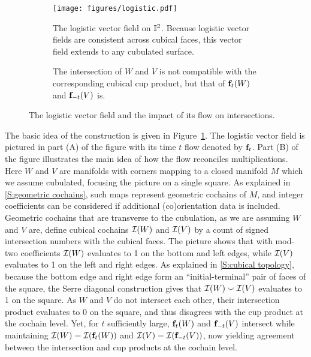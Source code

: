 \begin{figure}[h]
	\centering
	\hfill
	\begin{subfigure}[b]{0.45\textwidth}
		\hspace*{-9pt}
		\texttt{[image: figures/logistic.pdf]}
		\caption{The logistic vector field on $\mathbb{I}^2$.
		Because logistic vector fields are consistent across cubical faces, this vector field extends to any cubulated surface.}
	\end{subfigure}
	\hspace{0.2 in}
	\begin{subfigure}[b]{0.45\textwidth}
		\raisebox{9.5pt}{}
		\caption{The intersection of $W$ and $V$ is not compatible with the corresponding cubical cup product, but that of $\mathbf{f}_t(W)$ and $\mathbf{f}_{-t}(V)$ is.}
	\end{subfigure}
	\caption{The logistic vector field and the impact of its flow on intersections.}
	\label{F: logistic}
\end{figure}

The basic idea of the construction is given in Figure~\ref{F: logistic}. The logistic vector field is pictured in part (A) of the figure with its time $t$ flow denoted by
$\mathbf{f}_t$.
Part (B) of the figure illustrates the main idea of how the flow reconciles multiplications.
Here $W$ and $V$ are manifolds with corners mapping to a closed manifold $M$ which we assume cubulated, focusing the picture on a single square.
As explained in \cref{S:geometric cochains}, such maps represent geometric cochains of $M$, and integer coefficients can be considered if additional (co)orientation data is included.
Geometric cochains that are transverse to the cubulation, as we are assuming $W$ and $V$ are, define cubical cochains $\mathcal{I}(W)$ and $\mathcal{I}(V)$ by a count of signed intersection numbers with the cubical faces.
The picture shows that with mod-two coefficients $\mathcal{I}(W)$ evaluates to 1 on the bottom and left edges, while $\mathcal{I}(V)$ evaluates to 1 on the left and right edges.
As explained in \cref{S:cubical topology}, because the bottom edge and right edge form an ``initial-terminal'' pair of faces of the square, the Serre diagonal construction gives that $\mathcal{I}(W) \smallsmile \mathcal{I}(V)$ evaluates to 1 on the square.
As $W$ and $V$ do not intersect each other, their intersection product evaluates to 0 on the square, and thus disagrees with the cup product at the cochain level.
Yet, for $t$ sufficiently large, $\mathbf{f}_t(W)$ and $\mathbf{f}_{-t}(V)$ intersect while maintaining $\mathcal{I}(W) = \mathcal{I}(\mathbf{f}_t(W))$ and $\mathcal{I}(V) = \mathcal{I}(\mathbf{f}_{-t}(V))$, now yielding agreement between the intersection and cup products at the cochain level.

